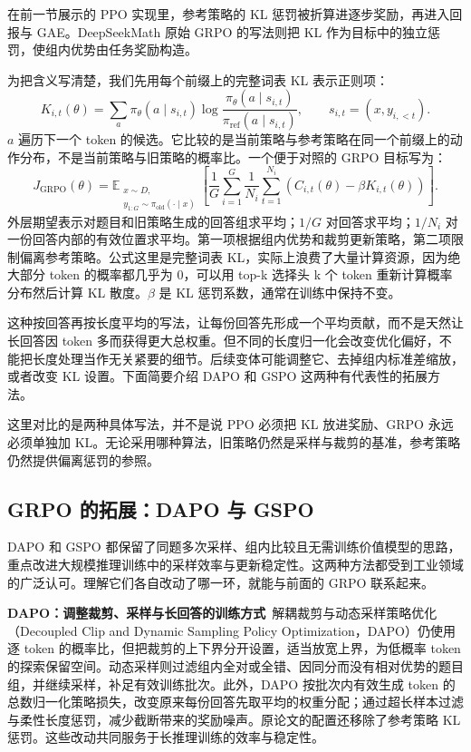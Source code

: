 在前一节展示的 PPO 实现里，参考策略的 KL 惩罚被折算进逐步奖励，再进入回报与 GAE。DeepSeekMath 原始 GRPO 的写法则把 KL 作为目标中的独立惩罚，使组内优势由任务奖励构造。

为把含义写清楚，我们先用每个前缀上的完整词表 KL 表示正则项：
\[
    K_{i,t}(\theta)=\sum_a\pi_\theta(a\mid s_{i,t})
       \log\frac{\pi_\theta(a\mid s_{i,t})}
                     {\pi_{\mathrm{ref}}(a\mid s_{i,t})},
    \qquad s_{i,t}=(x,y_{i,<t}).
\]
$a$ 遍历下一个 token 的候选。它比较的是当前策略与参考策略在同一个前缀上的动作分布，不是当前策略与旧策略的概率比。一个便于对照的 GRPO 目标写为：
\[
    J_{\mathrm{GRPO}}(\theta)=
      \mathbb E_{\substack{x\sim D,\\
                  y_{1:G}\sim\pi_{\mathrm{old}}(\cdot\mid x)}}
      \left[\frac1G\sum_{i=1}^{G}\frac1{N_i}
         \sum_{t=1}^{N_i}\left(C_{i,t}(\theta)-\beta K_{i,t}(\theta)\right)
      \right].
\]
外层期望表示对题目和旧策略生成的回答组求平均；$1/G$ 对回答求平均；$1/N_i$ 对一份回答内部的有效位置求平均。第一项根据组内优势和裁剪更新策略，第二项限制偏离参考策略。公式这里是完整词表 KL，实际上浪费了大量计算资源，因为绝大部分 token 的概率都几乎为 0，可以用 top-k 选择头 k 个 token 重新计算概率分布然后计算 KL 散度。$\beta$ 是 KL 惩罚系数，通常在训练中保持不变。

这种按回答再按长度平均的写法，让每份回答先形成一个平均贡献，而不是天然让长回答因 token 多而获得更大总权重。但不同的长度归一化会改变优化偏好，不能把长度处理当作无关紧要的细节。后续变体可能调整它、去掉组内标准差缩放，或者改变 KL 设置。下面简要介绍 DAPO 和 GSPO 这两种有代表性的拓展方法。

这里对比的是两种具体写法，并不是说 PPO 必须把 KL 放进奖励、GRPO 永远必须单独加 KL。无论采用哪种算法，旧策略仍然是采样与裁剪的基准，参考策略仍然提供偏离惩罚的参照。

\subsection{GRPO 的拓展：DAPO 与 GSPO}

DAPO 和 GSPO 都保留了同题多次采样、组内比较且无需训练价值模型的思路，重点改进大规模推理训练中的采样效率与更新稳定性。这两种方法都受到工业领域的广泛认可。理解它们各自改动了哪一环，就能与前面的 GRPO 联系起来。

\textbf{DAPO：调整裁剪、采样与长回答的训练方式}~解耦裁剪与动态采样策略优化（Decoupled Clip and Dynamic Sampling Policy Optimization，DAPO）仍使用逐 token 的概率比，但把裁剪的上下界分开设置，适当放宽上界，为低概率 token 的探索保留空间。动态采样则过滤组内全对或全错、因同分而没有相对优势的题目组，并继续采样，补足有效训练批次。此外，DAPO 按批次内有效生成 token 的总数归一化策略损失，改变原来每份回答先取平均的权重分配；通过超长样本过滤与柔性长度惩罚，减少截断带来的奖励噪声。原论文的配置还移除了参考策略 KL 惩罚。这些改动共同服务于长推理训练的效率与稳定性。

